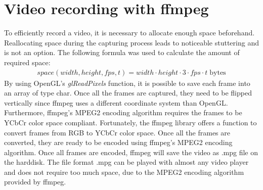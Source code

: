 \documentclass[11pt,a4paper,twoside,openright]{report}
\begin{document}
\section{Video recording with ffmpeg}
To efficiently record a video, it is necessary to allocate enough space beforehand. Reallocating space during the capturing process leads to noticeable stuttering and is not an option. The following formula was used to calculate the amount of required space:
\begin{align}
space(width, height, fps, t) = width \cdot height \cdot 3 \cdot fps \cdot t \; \mathrm{bytes}
\end{align}
By using OpenGL's \emph{glReadPixels} function, it is possible to save each frame into an array of type char. Once all the frames are captured, they need to be flipped vertically since ffmpeg uses a different coordinate system than OpenGL. Furthermore, ffmpeg's MPEG2 encoding algorithm requires the frames to be YCbCr color space compliant. Fortunately, the ffmpeg library offers a function to convert frames from RGB to YCbCr color space. Once all the frames are converted, they are ready to be encoded using ffmpeg's MPEG2 encoding algorithm. Once all frames are encoded, ffmpeg will save the video as .mpg file on the harddisk. The file format .mpg can be played with almost any video player and does not require too much space, due to the MPEG2 encoding algorithm provided by ffmpeg.
\end{document}
